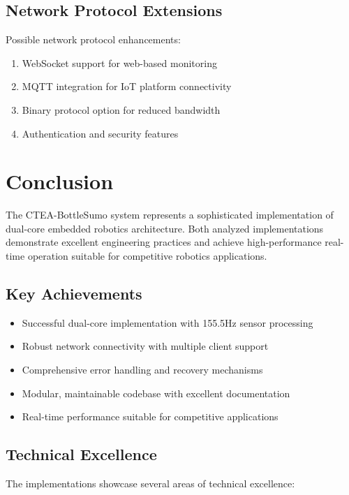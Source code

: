\documentclass[12pt,a4paper]{article}
\begin{document}
\subsection{Network Protocol Extensions}

Possible network protocol enhancements:

\begin{enumerate}
    \item WebSocket support for web-based monitoring
    \item MQTT integration for IoT platform connectivity
    \item Binary protocol option for reduced bandwidth
    \item Authentication and security features
\end{enumerate}

\section{Conclusion}

The CTEA-BottleSumo system represents a sophisticated implementation of dual-core embedded robotics architecture. Both analyzed implementations demonstrate excellent engineering practices and achieve high-performance real-time operation suitable for competitive robotics applications.

\subsection{Key Achievements}

\begin{itemize}
    \item Successful dual-core implementation with 155.5Hz sensor processing
    \item Robust network connectivity with multiple client support
    \item Comprehensive error handling and recovery mechanisms
    \item Modular, maintainable codebase with excellent documentation
    \item Real-time performance suitable for competitive applications
\end{itemize}

\subsection{Technical Excellence}

The implementations showcase several areas of technical excellence:
\end{document}
